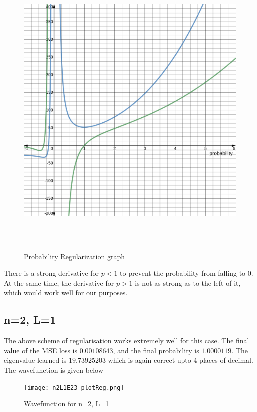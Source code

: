 \documentclass{article}
\begin{document}
\begin{figure}[!htb]
    \centering
    \includegraphics[width=5.5in,height=5.5in,keepaspectratio]{probReg.png}
    \label{fig:probReg}
    \caption{Probability Regularization graph}
\end{figure}

\newpage

\justify
There is a strong derivative for $p<1$ to prevent the probability from falling to 0. At the same time, the derivative for $p>1$ is not as strong as to the left of it, which would work well for our purposes.

\subsection{n=2, L=1}

\justify
The above scheme of regularisation works extremely well for this case. The final value of the MSE loss is $0.00108643$, and the final probability is $1.0000119$. The eigenvalue learned is $19.73925203$ which is again correct upto 4 places of decimal. The wavefunction is given below - 

\begin{figure}[!htb]
    \centering
    \texttt{[image: n2L1E23\_plotReg.png]}
    \label{fig:n2L3_plotReg}
    \caption{Wavefunction for n=2, L=1}
\end{figure}
\end{document}
